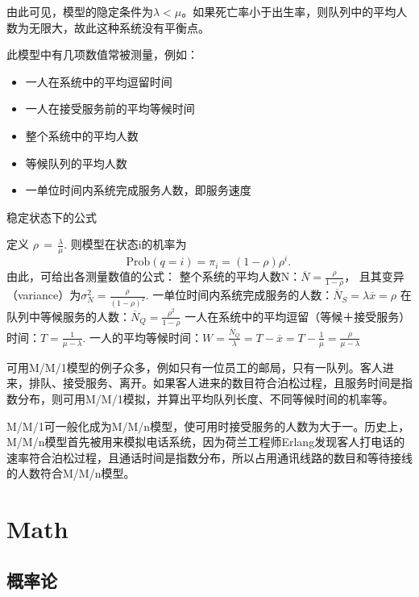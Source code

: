 \documentclass[openany]{book}
\begin{document}
由此可见，模型的隐定条件为$\lambda < \mu$。如果死亡率小于出生率，则队列中的平均人数为无限大，故此这种系统没有平衡点。

此模型中有几项数值常被测量，例如：
\begin{itemize}
\item 一人在系统中的平均逗留时间
\item 一人在接受服务前的平均等候时间
\item 整个系统中的平均人数
\item 等候队列的平均人数
\item 一单位时间内系统完成服务人数，即服务速度
\end{itemize}

稳定状态下的公式

定义 $\scriptstyle \rho \,=\,{\tfrac  {\lambda }{\mu }}$.
则模型在状态i的机率为
$$
{\mbox{Prob}}(q=i)=\pi _{i}=(1-\rho )\rho ^{i}.\,
$$
由此，可给出各测量数值的公式：
整个系统的平均人数N：$\overline N={\frac  {\rho }{1-\rho }}$，
且其变异（variance）为$\sigma _{N}^{2}={\frac  {\rho }{(1-\rho )^{2}}}$.
一单位时间内系统完成服务的人数：$\overline N_{S}=\lambda \overline x=\rho$
在队列中等候服务的人数：$\overline N_{Q}={\frac  {\rho ^{2}}{1-\rho }}$
一人在系统中的平均逗留（等候＋接受服务）时间：$T={\frac  {1}{\mu -\lambda }}$.
一人的平均等候时间：$W={\frac  {\overline N_{Q}}{\lambda }}=T-\overline x=T-{\frac  {1}{\mu }}={\frac  {\rho }{\mu -\lambda }}$

\begin{example}
可用M/M/1模型的例子众多，例如只有一位员工的邮局，只有一队列。客人进来，排队、接受服务、离开。如果客人进来的数目符合泊松过程，且服务时间是指数分布，则可用M/M/1模拟，并算出平均队列长度、不同等候时间的机率等。

M/M/1可一般化成为M/M/n模型，使可用时接受服务的人数为大于一。历史上，M/M/n模型首先被用来模拟电话系统，因为荷兰工程师Erlang发现客人打电话的速率符合泊松过程，且通话时间是指数分布，所以占用通讯线路的数目和等待接线的人数符合M/M/n模型。
\end{example}

\part{Math}
\chapter{概率论}
\label{sec:probability}
\end{document}
